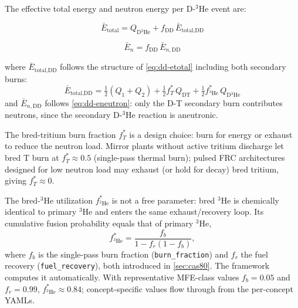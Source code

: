 \documentclass{article}
\begin{document}
The effective total energy and neutron energy per D-${}^3$He event are:

\begin{equation}
\label{eq:dhe3-etotal}
\bar{E}_{\text{total}} = Q_{\text{D}{}^3\text{He}}
  + f_{\text{DD}} \, \bar{E}_{\text{total,DD}}
\end{equation}

\begin{equation}
\label{eq:dhe3-eneutron}
\bar{E}_n = f_{\text{DD}} \, \bar{E}_{n,\text{DD}}
\end{equation}

\noindent where $\bar{E}_{\text{total,DD}}$ follows the structure
of \cref{eq:dd-etotal} including both secondary burns:
\begin{equation*}
\bar{E}_{\text{total,DD}} = \tfrac{1}{2}(Q_1 + Q_2)
  + \tfrac{1}{2} f_T^* \, Q_{\text{DT}}
  + \tfrac{1}{2} f_{{}^3\text{He}}^*
    \, Q_{\text{D}{}^3\text{He}}
\end{equation*}
and $\bar{E}_{n,\text{DD}}$ follows \cref{eq:dd-eneutron}: only the
D-T secondary burn contributes neutrons, since the secondary
D-${}^3$He reaction is aneutronic.

The bred-tritium burn fraction $f_T^*$ is a design choice: burn for
energy or exhaust to reduce the neutron load. Mirror plants without
active tritium discharge let bred T burn at
$f_T^* \approx 0.5$ (single-pass thermal burn); pulsed FRC
architectures designed for low neutron load may exhaust (or hold for
decay) bred tritium, giving $f_T^* \approx 0$.

The bred-${}^3$He utilization $f_{{}^3\text{He}}^*$ is not a free
parameter: bred ${}^3$He is chemically identical to primary
${}^3$He and enters the same exhaust/recovery loop. Its cumulative
fusion probability equals that of primary ${}^3$He,
\begin{equation}
\label{eq:dhe3-fhe3-star}
f_{{}^3\text{He}}^* = \frac{f_b}{1 - f_r (1 - f_b)},
\end{equation}
where $f_b$ is the single-pass burn fraction (\texttt{burn\_fraction})
and $f_r$ the fuel recovery (\texttt{fuel\_recovery}), both introduced
in \cref{sec:cas80}. The framework computes it automatically. With
representative MFE-class values $f_b = 0.05$ and $f_r = 0.99$,
$f_{{}^3\text{He}}^* \approx 0.84$; concept-specific values flow
through from the per-concept YAMLs.
\end{document}
